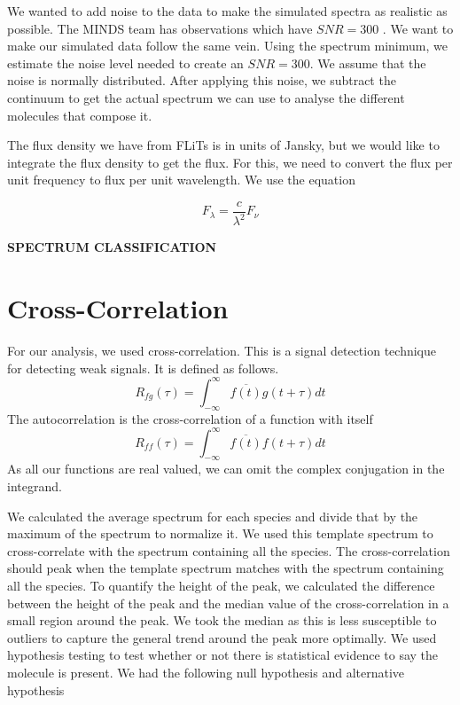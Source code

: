 \documentclass[twoside, single, authoryear, semicolon]{lion-msc}
\newcommand{\3}{$_3$}
\newcommand{\2}{$_2$}
\begin{document}
We wanted to add noise to the data to make the simulated spectra as realistic as possible. The MINDS team has observations which have $SNR = 300$ \citep{SOURCE}. We want to make our simulated data follow the same vein. Using the spectrum minimum, we estimate the noise level needed to create an $SNR = 300$. We assume that the noise is normally distributed. After applying this noise, we subtract the continuum to get the actual spectrum we can use to analyse the different molecules that compose it.


The flux density we have from FLiTs is in units of Jansky, but we would like to integrate the flux density to get the flux. For this, we need to convert the flux per unit frequency to flux per unit wavelength. We use the equation

\begin{equation}
    F_\lambda=\frac{c}{\lambda^2}F_\nu
\end{equation}

\textbf{SPECTRUM CLASSIFICATION}

\section{Cross-Correlation}
For our analysis, we used cross-correlation. This is a signal detection technique for detecting weak signals. It is defined as follows. 
\begin{equation}
    R_{fg}(\tau)=\int^\infty_{-\infty}\overline{f(t)}g(t+\tau)dt
\end{equation}
The autocorrelation is the cross-correlation of a function with itself
\begin{equation}
    R_{ff}(\tau)=\int^\infty_{-\infty}\overline{f(t)}f(t+\tau)dt
\end{equation}
As all our functions are real valued, we can omit the complex conjugation in the integrand.

We calculated the average spectrum for each species and divide that by the maximum of the spectrum to normalize it. We used this template spectrum to cross-correlate with the spectrum containing all the species. The cross-correlation should peak when the template spectrum matches with the spectrum containing all the species. To quantify the height of the peak, we calculated the difference between the height of the peak and the median value of the cross-correlation in a small region around the peak. We took the median as this is less susceptible to outliers to capture the general trend around the peak more optimally. We used hypothesis testing to test whether or not there is statistical evidence to say the molecule is present. We had the following null hypothesis and alternative hypothesis
\end{document}
